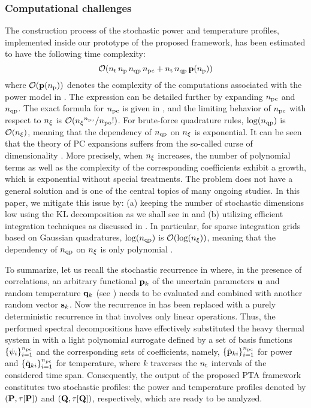 \subsubsection{Computational challenges} 
The construction process of the stochastic power and temperature profiles, implemented inside our prototype of the proposed framework, has been estimated to have the following time complexity:
\[
  \mathcal{O}({n_\text{t}} \, {n_\text{p}} \, {n_\text{qp}} \, {n_\text{pc}} + {n_\text{t}} \, {n_\text{qp}} \, \mathbf{p}({n_\text{p}}))
\]
where $\mathcal{O}(\mathbf{p}({n_\text{p}}))$ denotes the complexity of the computations associated with the power model in .
The expression can be detailed further by expanding ${n_\text{pc}}$ and ${n_\text{qp}}$.
The exact formula for ${n_\text{pc}}$ is given in , and the limiting behavior of ${n_\text{pc}}$ with respect to ${n_\xi}$ is $\mathcal{O}({n_\xi}^{n_\text{po}} / {n_\text{po}}!)$.
For brute-force quadrature rules, $\log({n_\text{qp}})$ is $\mathcal{O}({n_\xi})$, meaning that the dependency of ${n_\text{qp}}$ on ${n_\xi}$ is exponential.
It can be seen that the theory of PC expansions suffers from the so-called curse of dimensionality \cite{xiu2010, eldred2008}.
More precisely, when ${n_\xi}$ increases, the number of polynomial terms as well as the complexity of the corresponding coefficients exhibit a growth, which is exponential without special treatments.
The problem does not have a general solution and is one of the central topics of many ongoing studies.
In this paper, we mitigate this issue by: (a) keeping the number of stochastic dimensions low using the KL decomposition as we shall see in  and (b) utilizing efficient integration techniques as discussed in .
In particular, for sparse integration grids based on Gaussian quadratures, $\log({n_\text{qp}})$ is $\mathcal{O}(\log({n_\xi}))$, meaning that the dependency of ${n_\text{qp}}$ on ${n_\xi}$ is only polynomial \cite{heiss2008}.

To summarize, let us recall the stochastic recurrence in  where, in the presence of correlations, an arbitrary functional $\mathbf{p}_k$ of the uncertain parameters $\mathbf{u}$ and random temperature $\mathbf{q}_k$ (see ) needs to be evaluated and combined with another random vector $\mathbf{s}_k$.
Now the recurrence in  has been replaced with a purely deterministic recurrence in  that involves only linear operations.
Thus, the performed spectral decompositions have effectively substituted the heavy thermal system in  with a light polynomial surrogate defined by a set of basis functions $\{ \psi_i \}_{i = 1}^{n_\text{pc}}$ and the corresponding sets of coefficients, namely, $\{ \hat{\mathbf{p}}_{ki} \}_{i = 1}^{n_\text{pc}}$ for power and $\{ \hat{\mathbf{q}}_{ki} \}_{i = 1}^{n_\text{pc}}$ for temperature, where $k$ traverses the ${n_\text{t}}$ intervals of the considered time span.
Consequently, the output of the proposed PTA framework constitutes two stochastic profiles: the power and temperature profiles denoted by $\profileP$ and $\profileT$, respectively, which are ready to be analyzed.

